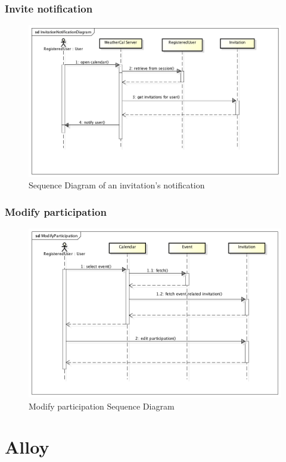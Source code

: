 \subsubsection{Invite notification}
\begin{center}
 \begin{figure}[H]
    \includegraphics[width=1\textwidth]{../UMLDiagram/sequence/InvitationNotificationDiagram/InvitationNotificationDiagram.png}
    \caption{Sequence Diagram of an invitation's notification}
     \label{fig:notseqdiagr}
     \end{figure}
   \end{center}  
\subsubsection{Modify participation}
\begin{center}
 \begin{figure}[H]
    \includegraphics[width=1\textwidth]{../UMLDiagram/sequence/ModifyParticipation/ModifyParticipation.png}
    \caption{Modify participation Sequence Diagram}
     \label{fig:modpartseqdiag}
     \end{figure}
   \end{center}  
\section{Alloy}







